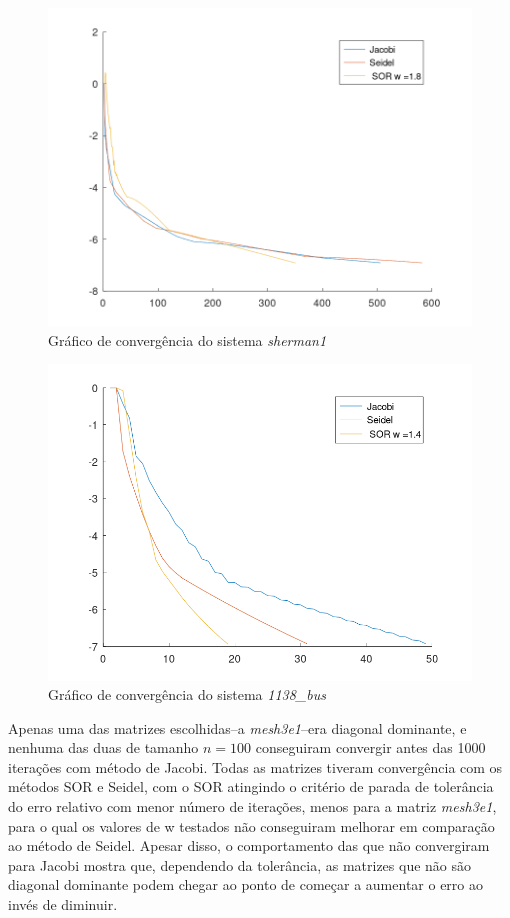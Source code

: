 \documentclass{article}
\begin{document}
\begin{figure}[H]
    \centering
    \includegraphics[width=.8\textwidth]{image/sherman1iterativo.png}
    \caption{Gráfico de convergência do sistema \textit{sherman1}}
    \label{fig:sherman1-iter}
\end{figure}

\begin{figure}[H]
    \centering
    \includegraphics[width=.8\textwidth]{image/1138_bus_iterativo.png}
    \caption{Gráfico de convergência do sistema \textit{1138\_bus}}
    \label{fig:bus-iter}
\end{figure}
\newpage

Apenas uma das matrizes escolhidas--a \textit{mesh3e1}--era diagonal dominante, e nenhuma das duas de tamanho $n=100$ conseguiram convergir antes das 1000 iterações com método de Jacobi. Todas as matrizes tiveram convergência com os métodos SOR e Seidel, com o SOR atingindo o critério de parada de tolerância do erro relativo com menor número de iterações, menos para a matriz \textit{mesh3e1}, para o qual os valores de w testados não conseguiram melhorar em comparação ao método de Seidel. Apesar disso, o comportamento das que não convergiram para Jacobi mostra que, dependendo da tolerância, as matrizes que não são diagonal dominante podem chegar ao ponto de começar a aumentar o erro ao invés de diminuir. 
\end{document}
